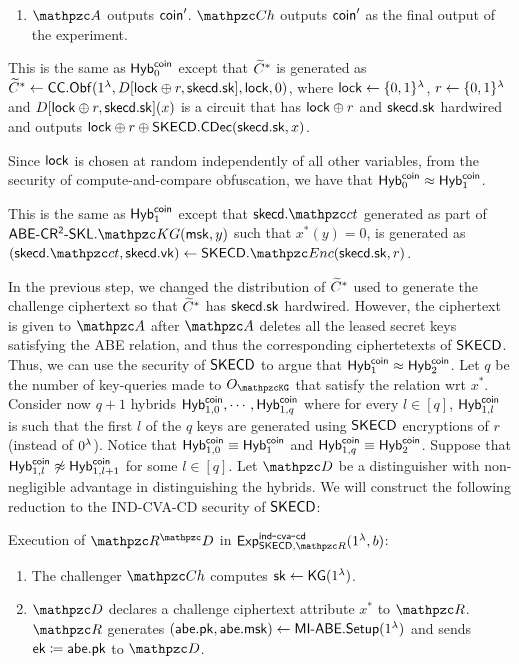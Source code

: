 \begin{description}
\begin{enumerate}
\item $\qA$ outputs $\mathsf{coin}^\prime$. $\qCh$ outputs $\mathsf{coin}'$ as the final output of the experiment.
\end{enumerate}

\item[$\hybi{1}^\coin$:]This is the same as $\mathsf{Hyb}_{0}^{\mathsf{coin}}$ except
that $\widetilde{C}^*$ is generated as $\widetilde{C}^*\leftarrow\mathsf{CC}.\mathsf{Obf}(1^\lambda,D[\mathsf{lock}\oplus
r, \mathsf{skecd}.\mathsf{sk}], \mathsf{lock},0)$, where $\mathsf{lock}\leftarrow\{0,1\}^\lambda$, $r\leftarrow\{0,1\}^\lambda$ and
$D[\mathsf{lock}\oplus r, \mathsf{skecd}.\mathsf{sk}](x)$ is a circuit that has $\mathsf{lock}\oplus
r$ and $\mathsf{skecd}.\mathsf{sk}$ hardwired and outputs $\mathsf{lock}\oplus
r\oplus\mathsf{SKECD}.\mathsf{CDec}(\mathsf{skecd}.\mathsf{sk},x)$.

Since $\mathsf{lock}$ is chosen at random independently of all other
variables, from the security of compute-and-compare obfuscation, we
have that $\mathsf{Hyb}_0^{\mathsf{coin}} \approx \mathsf{Hyb}_1^{\mathsf{coin}}$.

\item[$\hybi{2}^\coin$:]This is the same as $\hybi{1}^\coin$ except
that $\skecd.\qct$ generated as part of $\ABECRCRSKL.\qKG(\msk, y)$
such that $x^*(y) = 0$, is generated as
$(\skecd.\qct,\allowbreak\skecd.\vk)\gets\SKECD.\qEnc(\skecd.\sk,r)$.

In the previous step, we changed the distribution of $\widetilde{C}^*$ used
to generate the challenge ciphertext so that $\widetilde{C}^*$ has
$\mathsf{skecd}.\mathsf{sk}$ hardwired. However, the ciphertext is given to $\qA$
after $\qA$ deletes all the leased secret keys satisfying the ABE
relation, and thus the
corresponding ciphertetexts of $\mathsf{SKECD}$.  Thus, we can use the security of
$\mathsf{SKECD}$ to argue that $\mathsf{Hyb}_{1}^{\mathsf{coin}} \approx \mathsf{Hyb}_{2}^{\mathsf{coin}}$. Let
$q$ be the number of key-queries made to $\Oracle{\qKG}$ that satisfy
the relation wrt $x^*$. Consider now $q+1$ hybrids $\mathsf{Hyb}_{1,0}^{\mathsf{coin}}, \cdots, 
\mathsf{Hyb}_{1,q}^{\mathsf{coin}}$ where for every $l \in [q]$, $\mathsf{Hyb}_{1,l}^{\mathsf{coin}}$
is such that the first $l$ of the $q$ keys are generated using
$\mathsf{SKECD}$ encryptions of $r$ (instead of $0^\lambda$). Notice that
$\mathsf{Hyb}_{1,0}^{\mathsf{coin}} \equiv \mathsf{Hyb}_1^{\mathsf{coin}}$ and
$\mathsf{Hyb}_{1,q}^{\mathsf{coin}} \equiv \mathsf{Hyb}_2^{\mathsf{coin}}$. Suppose that
$\mathsf{Hyb}_{1,l}^{\mathsf{coin}} \not\approx \mathsf{Hyb}_{1,l+1}^{\mathsf{coin}}$ for some $l \in
[q]$. Let $\qD$ be a distinguisher with non-negligible advantage in
distinguishing the hybrids.
We will construct the following reduction to the IND-CVA-CD
security of $\mathsf{SKECD}$:

\begin{description}
\item Execution of $\qR^\qD$ in
$\expc{\SKECD,\qR}{ind}{cva}{cd}(1^\secp,b)$:
\begin{enumerate}
\item The challenger $\qCh$ computes $\mathsf{sk} \leftarrow \mathsf{KG}(1^\lambda)$.
\item $\qD$ declares a challenge ciphertext attribute $x^*$ to $\qR$. $\qR$ generates $(\mathsf{abe}.\mathsf{pk}, \mathsf{abe}.\mathsf{msk}) \leftarrow
\mathsf{MI}\textrm{-}\mathsf{ABE}.\mathsf{Setup}(\allowbreak1^\lambda)$ and sends $\mathsf{ek} \coloneqq \mathsf{abe}.\mathsf{pk}$ to $\qD$.


\end{enumerate}
\end{description}
\end{description}
